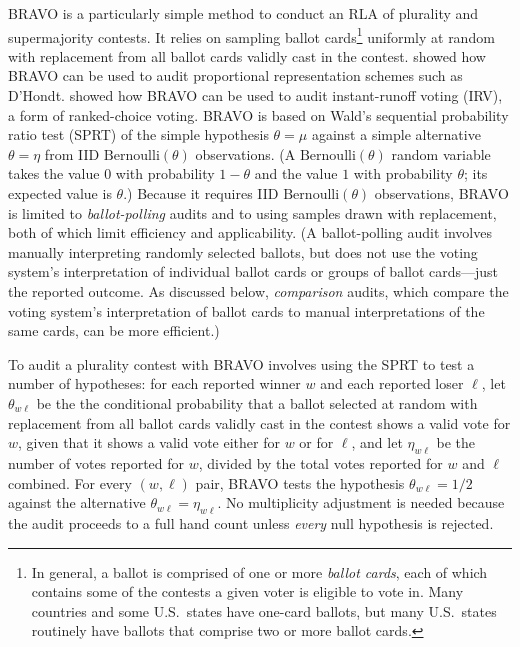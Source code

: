 \documentclass[aoas]{imsart}
\newcommand{\Bern}{\ensuremath{\mathrm{Bernoulli}}}
\begin{document}
BRAVO \citep{lindemanEtal12} is a particularly
simple method to conduct an RLA of plurality and supermajority contests.
It relies on sampling ballot cards\footnote{%
In general, a ballot is comprised of one or more \emph{ballot cards}, each of which contains some of the contests
a given voter is eligible to vote in.
Many countries and some U.S.\ states have one-card ballots, but many U.S.\ states routinely
have ballots that comprise two or more
ballot cards.
}  
uniformly at random with replacement from all ballot cards validly cast in the contest.
\citet{starkTeague14} showed how BRAVO can be used to audit proportional representation schemes such as D'Hondt.
\citet{blomEtal18} showed how BRAVO can be used to audit instant-runoff voting (IRV), a form of ranked-choice voting.
BRAVO is based on Wald's \citep{wald45} sequential probability ratio test (SPRT) of the simple hypothesis 
$\theta = \mu$ against a simple alternative $\theta = \eta$ from IID $\Bern(\theta)$ observations.
(A $\Bern(\theta)$ random variable takes the value $0$ with probability $1-\theta$ and the value $1$ with probability $\theta$;
its expected value is $\theta$.)
Because it requires IID $\Bern(\theta)$ observations, BRAVO is limited to \emph{ballot-polling} audits and to using samples drawn with 
replacement, both of which limit efficiency and applicability.
(A ballot-polling audit involves manually interpreting randomly selected ballots, but does not use the voting system's
interpretation of individual ballot cards or groups of ballot cards---just the reported outcome.
As discussed below, \emph{comparison} audits, which compare the voting system's interpretation of ballot cards to
manual interpretations of the same cards, can be more efficient.)

To audit a plurality contest with BRAVO involves using the SPRT to test a number of hypotheses:
for each reported winner $w$ and each reported loser $\ell$, let $\theta_{w\ell}$ be the 
the conditional probability that a ballot selected at random with replacement
from all ballot cards validly cast in the contest shows a valid vote for $w$, given that it shows a valid vote either for $w$ or for $\ell$,
and let $\eta_{w\ell}$ be the number of votes reported for $w$, divided by the total votes reported for $w$ and $\ell$ combined.
For every  $(w, \ell)$ pair,
BRAVO tests the hypothesis $\theta_{w\ell} = 1/2$ against the alternative $\theta_{w\ell} = \eta_{w\ell}$.
No multiplicity adjustment is needed because the audit proceeds to a full hand count unless \emph{every} null hypothesis
is rejected.
\end{document}
